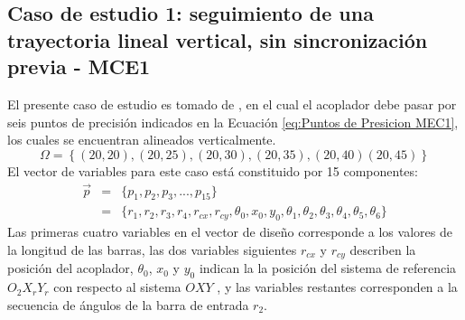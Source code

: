 \subsection{Caso de estudio 1: seguimiento de una trayectoria lineal vertical, sin
sincronización previa - MCE1}
El presente caso de estudio es tomado de \cite{VegaMEC1}, en el cual el acoplador debe pasar por
seis puntos de precisión indicados en la Ecuación \ref{eq:Puntos de Presicion MEC1}, los cuales se encuentran alineados verticalmente.
\begin{equation}\label{eq:Puntos de Presicion MEC1}
\Omega = \left \{ (20, 20), (20, 25), (20, 30), (20, 35), (20, 40) (20, 45)\right\} 
\end{equation}
El vector de variables para este caso está constituido por 15 componentes:
\begin{eqnarray}\label{eq:Vector variables MEC1}
\vec{p} &=& \{p_1,p_2,p_3,...,p_{15} \}\\
       &=& \{ r_1,r_2,r_3,r_4,r_{cx},r_{cy},\theta_0,x_0,y_0,\theta_1,\theta_2,\theta_3,\theta_4,\theta_5,\theta_6 \} 
\end{eqnarray}
Las primeras cuatro variables en el vector de diseño corresponde a los valores de la longitud de las barras, las dos variables siguientes $r_{cx}$ y $r_{cy}$ describen la posición del acoplador, $\theta_0$, $x_0$ y $y_0$ indican la la posición del sistema de referencia $O_2X_rY_r$ con respecto al sistema $OXY$ , y las variables restantes corresponden a la secuencia de ángulos de la barra de entrada $r_2$.

